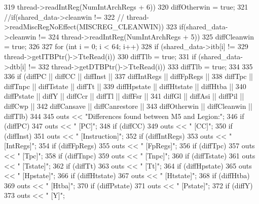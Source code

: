 \begin{DoxyCode}
{{{{319                         thread->readIntReg(NumIntArchRegs + 6))
320                     diffOtherwin = true;
321                 //if(shared_data->cleanwin !=
322                 //        thread->readMiscRegNoEffect(MISCREG_CLEANWIN))
323                 if(shared_data->cleanwin !=
324                         thread->readIntReg(NumIntArchRegs + 5))
325                     diffCleanwin = true;
326 
327                 for (int i = 0; i < 64; i++) {
328                     if (shared_data->itb[i] !=
329                             thread->getITBPtr()->TteRead(i))
330                         diffTlb = true;
331                     if (shared_data->dtb[i] !=
332                             thread->getDTBPtr()->TteRead(i))
333                         diffTlb = true;
334                 }
335 
336                 if (diffPC || diffCC || diffInst ||
337                     diffIntRegs || diffFpRegs ||
338                     diffTpc || diffTnpc || diffTstate || diffTt ||
339                     diffHpstate || diffHtstate || diffHtba ||
340                     diffPstate || diffY || diffCcr || diffTl || diffFsr ||
341                     diffGl || diffAsi || diffPil || diffCwp ||
342                     diffCansave || diffCanrestore ||
343                     diffOtherwin || diffCleanwin || diffTlb) {
344 
345                     outs << "Differences found between M5 and Legion:";
346                     if (diffPC)
347                         outs << " [PC]";
348                     if (diffCC)
349                         outs << " [CC]";
350                     if (diffInst)
351                         outs << " [Instruction]";
352                     if (diffIntRegs)
353                         outs << " [IntRegs]";
354                     if (diffFpRegs)
355                         outs << " [FpRegs]";
356                     if (diffTpc)
357                         outs << " [Tpc]";
358                     if (diffTnpc)
359                         outs << " [Tnpc]";
360                     if (diffTstate)
361                         outs << " [Tstate]";
362                     if (diffTt)
363                         outs << " [Tt]";
364                     if (diffHpstate)
365                         outs << " [Hpstate]";
366                     if (diffHtstate)
367                         outs << " [Htstate]";
368                     if (diffHtba)
369                         outs << " [Htba]";
370                     if (diffPstate)
371                         outs << " [Pstate]";
372                     if (diffY)
373                         outs << " [Y]";
}}}}}
\end{DoxyCode}
